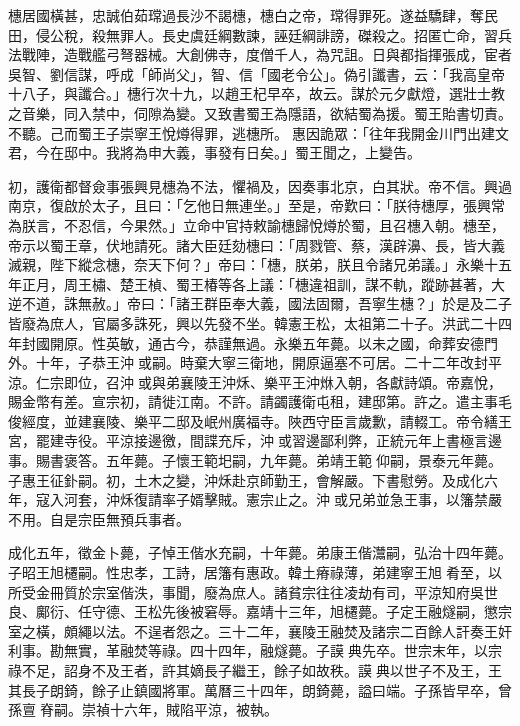 橞居國橫甚，忠誠伯茹瑺過長沙不謁橞，橞白之帝，瑺得罪死。遂益驕肆，奪民田，侵公稅，殺無罪人。長史虞廷綱數諫，誣廷綱誹謗，磔殺之。招匿亡命，習兵法戰陣，造戰艦弓弩器械。大創佛寺，度僧千人，為咒詛。日與都指揮張成，宦者吳智、劉信謀，呼成「師尚父」，智、信「國老令公」。偽引讖書，云：「我高皇帝十八子，與讖合。」橞行次十九，以趙王杞早卒，故云。謀於元夕獻燈，選壯士教之音樂，同入禁中，伺隙為變。又致書蜀王為隱語，欲結蜀為援。蜀王貽書切責。不聽。己而蜀王子崇寧王悅燇得罪，逃橞所。惠因詭眾：「往年我開金川門出建文君，今在邸中。我將為申大義，事發有日矣。」蜀王聞之，上變告。

初，護衛都督僉事張興見橞為不法，懼禍及，因奏事北京，白其狀。帝不信。興過南京，復啟於太子，且曰：「乞他日無連坐。」至是，帝歎曰：「朕待橞厚，張興常為朕言，不忍信，今果然。」立命中官持敕諭橞歸悅燇於蜀，且召橞入朝。橞至，帝示以蜀王章，伏地請死。諸大臣廷劾橞曰：「周戮管、蔡，漢辟濞、長，皆大義滅親，陛下縱念橞，奈天下何？」帝曰：「橞，朕弟，朕且令諸兄弟議。」永樂十五年正月，周王橚、楚王楨、蜀王椿等各上議：「橞違祖訓，謀不軌，蹤跡甚著，大逆不道，誅無赦。」帝曰：「諸王群臣奉大義，國法固爾，吾寧生橞？」於是及二子皆廢為庶人，官屬多誅死，興以先發不坐。韓憲王松，太祖第二十子。洪武二十四年封國開原。性英敏，通古今，恭謹無過。永樂五年薨。以未之國，命葬安德門外。十年，子恭王沖或嗣。時棄大寧三衛地，開原逼塞不可居。二十二年改封平涼。仁宗即位，召沖或與弟襄陵王沖秌、樂平王沖烌入朝，各獻詩頌。帝嘉悅，賜金幣有差。宣宗初，請徙江南。不許。請蠲護衛屯租，建邸第。許之。遣主事毛俊經度，並建襄陵、樂平二邸及岷州廣福寺。陜西守臣言歲歉，請輟工。帝令繕王宮，罷建寺役。平涼接邊徼，間諜充斥，沖或習邊鄙利弊，正統元年上書極言邊事。賜書褒答。五年薨。子懷王範圯嗣，九年薨。弟靖王範仰嗣，景泰元年薨。子惠王征釙嗣。初，土木之變，沖秌赴京師勤王，會解嚴。下書慰勞。及成化六年，寇入河套，沖秌復請率子婿擊賊。憲宗止之。沖或兄弟並急王事，以籓禁嚴不用。自是宗臣無預兵事者。

成化五年，徵金卜薨，子悼王偕水充嗣，十年薨。弟康王偕灊嗣，弘治十四年薨。子昭王旭櫏嗣。性忠孝，工詩，居籓有惠政。韓土瘠祿薄，弟建寧王旭肴至，以所受金冊質於宗室偕泆，事聞，廢為庶人。諸貧宗往往凌劫有司，平涼知府吳世良、鄺衍、任守德、王松先後被窘辱。嘉靖十三年，旭櫏薨。子定王融燧嗣，懲宗室之橫，頗繩以法。不逞者怨之。三十二年，襄陵王融焚及諸宗二百餘人訐奏王奸利事。勘無實，革融焚等祿。四十四年，融燧薨。子謨典先卒。世宗末年，以宗祿不足，詔身不及王者，許其嫡長子繼王，餘子如故秩。謨典以世子不及王，王其長子朗錡，餘子止鎮國將軍。萬曆三十四年，朗錡薨，謚曰端。子孫皆早卒，曾孫亶脊嗣。崇禎十六年，賊陷平涼，被執。


